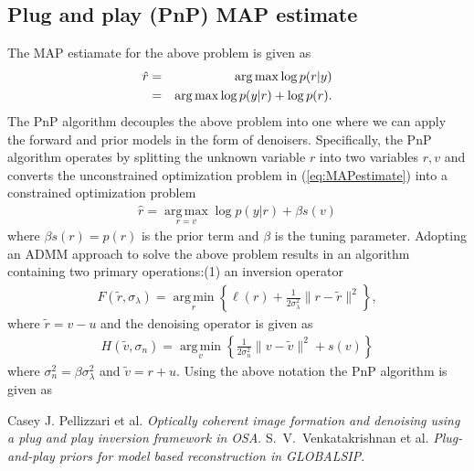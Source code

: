 \documentclass[a4paper, 11pt]{article}
\DeclareMathOperator*{\argmax}{arg\,max}
\DeclareMathOperator*{\argmin}{arg\,min}
\begin{document}
\subsection{Plug and play (PnP) MAP estimate}
The MAP estiamate for the above problem is given as 
\begin{eqnarray}
\hat{r}&=& \argmax \log p(r|y) \notag\\
&=& \argmax \log p(y|r)+\log p(r). \label{eq:MAPestimate}
\end{eqnarray}
The PnP algorithm \cite{PnPalgorithm} decouples the above problem into one where we can apply the forward and prior models in the form of denoisers. Specifically, the PnP algorithm operates by splitting the unknown variable $r$ into two variables $r,v$ and converts the unconstrained optimization problem in (\ref{eq:MAPestimate}) into a constrained optimization problem 
\begin{eqnarray} 
\hat{r}=\underset{r=v}{\argmax} \log p(y|r)+\beta s(v)
\end{eqnarray}
where $\beta s(r)=p(r)$ is the prior term and $\beta$ is the tuning parameter. Adopting an ADMM approach to solve the above problem results in an algorithm containing two primary operations:(1) an inversion operator 
\begin{eqnarray*}
F(\tilde{r},\sigma_\lambda)=\underset{r}{\argmin} \left \{ \ell(r)+\frac{1}{2\sigma_\lambda^2} \|r-\tilde{r}\|^2 \right \}, 
\end{eqnarray*}
 where $\tilde{r}=v-u$ and the denoising operator is given as 
\begin{eqnarray*}
H(\tilde{v},\sigma_n)=\underset{v}{\argmin} \left \{ \frac{1}{2\sigma_n^2} \|v-\tilde{v}\|^2 +s(v)\right \} 
\end{eqnarray*}
where $\sigma_n^2=\beta \sigma_\lambda^2$ and $\tilde{v}=r+u$. Using the above notation the PnP algorithm is given as 


\begin{thebibliography}{9}
 Casey J. Pellizzari et al. \emph{Optically coherent image formation and denoising using a plug and play inversion framework in OSA}.
 S.~V.~Venkatakrishnan et al. \emph{Plug-and-play priors for model based reconstruction in GLOBALSIP}.
\end{thebibliography}
\end{document}

